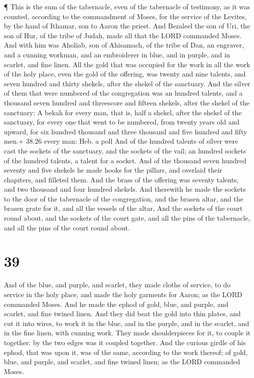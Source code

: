  ¶ This is the sum of the tabernacle, even of the
tabernacle of testimony, as it was counted, according to the commandment
of Moses, for the service of the Levites, by the hand of Ithamar, son to
Aaron the priest.  And Bezaleel the son of Uri, the son of
Hur, of the tribe of Judah, made all that the LORD commanded Moses.
 And with him was Aholiab, son of Ahisamach, of the tribe
of Dan, an engraver, and a cunning workman, and an embroiderer in blue,
and in purple, and in scarlet, and fine linen.  All the
gold that was occupied for the work in all the work of the holy place,
even the gold of the offering, was twenty and nine talents, and seven
hundred and thirty shekels, after the shekel of the sanctuary.
 And the silver of them that were numbered of the
congregation was an hundred talents, and a thousand seven hundred and
threescore and fifteen shekels, after the shekel of the sanctuary:
 A bekah for every man, that is, half a shekel, after the
shekel of the sanctuary, for every one that went to be numbered, from
twenty years old and upward, for six hundred thousand and three thousand
and five hundred and fifty men.+ 38.26 every man: Heb. a poll
 And of the hundred talents of silver were cast the sockets
of the sanctuary, and the sockets of the vail; an hundred sockets of the
hundred talents, a talent for a socket.  And of the
thousand seven hundred seventy and five shekels he made hooks for the
pillars, and overlaid their chapiters, and filleted them. 
And the brass of the offering was seventy talents, and two thousand and
four hundred shekels.  And therewith he made the sockets to
the door of the tabernacle of the congregation, and the brasen altar,
and the brasen grate for it, and all the vessels of the altar,
 And the sockets of the court round about, and the sockets
of the court gate, and all the pins of the tabernacle, and all the pins
of the court round about.

\hypertarget{section-38}{%
\section{39}\label{section-38}}

 And of the blue, and purple, and scarlet, they made cloths
of service, to do service in the holy place, and made the holy garments
for Aaron; as the LORD commanded Moses.  And he made the
ephod of gold, blue, and purple, and scarlet, and fine twined linen.
 And they did beat the gold into thin plates, and cut it
into wires, to work it in the blue, and in the purple, and in the
scarlet, and in the fine linen, with cunning work.  They
made shoulderpieces for it, to couple it together: by the two edges was
it coupled together.  And the curious girdle of his ephod,
that was upon it, was of the same, according to the work thereof; of
gold, blue, and purple, and scarlet, and fine twined linen; as the LORD
commanded Moses.

